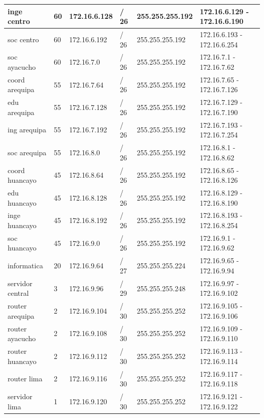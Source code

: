 \begin{table}[htbp]
\begin{tabular}{|l|l|l|l|l|l|}
inge centro          & 60             & 172.16.6.128       & / 26          & 255.255.255.192  & 172.16.6.129 - 172.16.6.190 \\ \hline
soc centro      & 60             & 172.16.6.192       & / 26          & 255.255.255.192  & 172.16.6.193 - 172.16.6.254 \\ \hline
soc ayacucho    & 60             & 172.16.7.0         & / 26          & 255.255.255.192  & 172.16.7.1 - 172.16.7.62    \\ \hline
coord arequipa       & 55             & 172.16.7.64        & / 26          & 255.255.255.192  & 172.16.7.65 - 172.16.7.126  \\ \hline
edu arequipa       & 55             & 172.16.7.128       & / 26          & 255.255.255.192  & 172.16.7.129 - 172.16.7.190 \\ \hline
ing arequipa         & 55             & 172.16.7.192       & / 26          & 255.255.255.192  & 172.16.7.193 - 172.16.7.254 \\ \hline
soc arequipa    & 55             & 172.16.8.0         & / 26          & 255.255.255.192  & 172.16.8.1 - 172.16.8.62    \\ \hline
coord huancayo       & 45             & 172.16.8.64        & / 26          & 255.255.255.192  & 172.16.8.65 - 172.16.8.126  \\ \hline
edu huancayo     & 45             & 172.16.8.128       & / 26          & 255.255.255.192  & 172.16.8.129 - 172.16.8.190 \\ \hline
inge huancayo        & 45             & 172.16.8.192       & / 26          & 255.255.255.192  & 172.16.8.193 - 172.16.8.254 \\ \hline
soc huancayo    & 45             & 172.16.9.0         & / 26          & 255.255.255.192  & 172.16.9.1 - 172.16.9.62    \\ \hline
informatica          & 20             & 172.16.9.64        & / 27          & 255.255.255.224  & 172.16.9.65 - 172.16.9.94   \\ \hline
servidor central     & 3              & 172.16.9.96        & / 29          & 255.255.255.248  & 172.16.9.97 - 172.16.9.102  \\ \hline
router arequipa      & 2              & 172.16.9.104       & / 30          & 255.255.255.252  & 172.16.9.105 - 172.16.9.106 \\ \hline
router ayacucho      & 2              & 172.16.9.108       & / 30          & 255.255.255.252  & 172.16.9.109 - 172.16.9.110 \\ \hline
router huancayo      & 2              & 172.16.9.112       & / 30          & 255.255.255.252  & 172.16.9.113 - 172.16.9.114 \\ \hline
router lima          & 2              & 172.16.9.116       & / 30          & 255.255.255.252  & 172.16.9.117 - 172.16.9.118 \\ \hline
servidor lima        & 1              & 172.16.9.120       & / 30          & 255.255.255.252  & 172.16.9.121 - 172.16.9.122 \\ \hline
\end{tabular}
\end{table}

